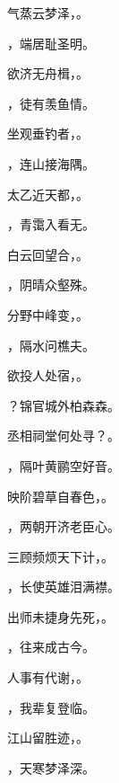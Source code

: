 \documentclass[12pt, a4paper, addpoints]{exam}
\begin{document}
\begin{questions}
\question[2] 气蒸云梦泽，\uline{\qquad\qquad\qquad\qquad}。

\question[2] \uline{\qquad\qquad\qquad\qquad}，端居耻圣明。

\question[2] 欲济无舟楫，\uline{\qquad\qquad\qquad\qquad}。

\question[2] \uline{\qquad\qquad\qquad\qquad}，徒有羡鱼情。

\question[2] 坐观垂钓者，\uline{\qquad\qquad\qquad\qquad}。

\question[2] \uline{\qquad\qquad\qquad\qquad}，连山接海隅。

\question[2] 太乙近天都，\uline{\qquad\qquad\qquad\qquad}。

\question[2] \uline{\qquad\qquad\qquad\qquad}，青霭入看无。

\question[2] 白云回望合，\uline{\qquad\qquad\qquad\qquad}。

\question[2] \uline{\qquad\qquad\qquad\qquad}，阴晴众壑殊。

\question[2] 分野中峰变，\uline{\qquad\qquad\qquad\qquad}。

\question[2] \uline{\qquad\qquad\qquad\qquad}，隔水问樵夫。

\question[2] 欲投人处宿，\uline{\qquad\qquad\qquad\qquad}。

\question[2] \uline{\qquad\qquad\qquad\qquad}？锦官城外柏森森。

\question[2] 丞相祠堂何处寻？\uline{\qquad\qquad\qquad\qquad}。

\question[2] \uline{\qquad\qquad\qquad\qquad}，隔叶黄鹂空好音。

\question[2] 映阶碧草自春色，\uline{\qquad\qquad\qquad\qquad}。

\question[2] \uline{\qquad\qquad\qquad\qquad}，两朝开济老臣心。

\question[2] 三顾频烦天下计，\uline{\qquad\qquad\qquad\qquad}。

\question[2] \uline{\qquad\qquad\qquad\qquad}，长使英雄泪满襟。

\question[2] 出师未捷身先死，\uline{\qquad\qquad\qquad\qquad}。

\question[2] \uline{\qquad\qquad\qquad\qquad}，往来成古今。

\question[2] 人事有代谢，\uline{\qquad\qquad\qquad\qquad}。

\question[2] \uline{\qquad\qquad\qquad\qquad}，我辈复登临。

\question[2] 江山留胜迹，\uline{\qquad\qquad\qquad\qquad}。

\question[2] \uline{\qquad\qquad\qquad\qquad}，天寒梦泽深。


\end{questions}
\end{document}
